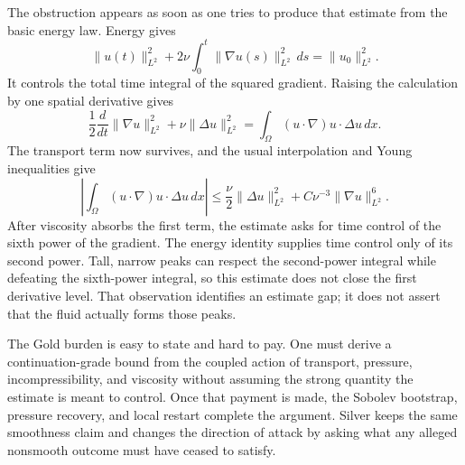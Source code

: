 The obstruction appears as soon as one tries to produce that estimate from the basic energy law.
Energy gives
\[
  \lVert u(t)\rVert_{L^2}^{2}
  +2\nu\int_0^t\lVert\nabla u(s)\rVert_{L^2}^{2}\,ds
  =
  \lVert u_0\rVert_{L^2}^{2}.
\]
It controls the total time integral of the squared gradient.
Raising the calculation by one spatial derivative gives
\[
  \frac12\frac{d}{dt}\lVert\nabla u\rVert_{L^2}^{2}
  +\nu\lVert\Delta u\rVert_{L^2}^{2}
  =
  \int_\Omega (u\cdot\nabla)u\cdot\Delta u\,dx.
\]
The transport term now survives, and the usual interpolation and Young inequalities give
\[
  \left|
    \int_\Omega (u\cdot\nabla)u\cdot\Delta u\,dx
  \right|
  \leq
  \frac{\nu}{2}\lVert\Delta u\rVert_{L^2}^{2}
  +C\nu^{-3}\lVert\nabla u\rVert_{L^2}^{6}.
\]
After viscosity absorbs the first term, the estimate asks for time control of the sixth power of the gradient.
The energy identity supplies time control only of its second power.
Tall, narrow peaks can respect the second-power integral while defeating the sixth-power integral, so this estimate does not close the first derivative level.
That observation identifies an estimate gap; it does not assert that the fluid actually forms those peaks.

The Gold burden is easy to state and hard to pay.
One must derive a continuation-grade bound from the coupled action of transport, pressure, incompressibility, and viscosity without assuming the strong quantity the estimate is meant to control.
Once that payment is made, the Sobolev bootstrap, pressure recovery, and local restart complete the argument.
Silver keeps the same smoothness claim and changes the direction of attack by asking what any alleged nonsmooth outcome must have ceased to satisfy.
